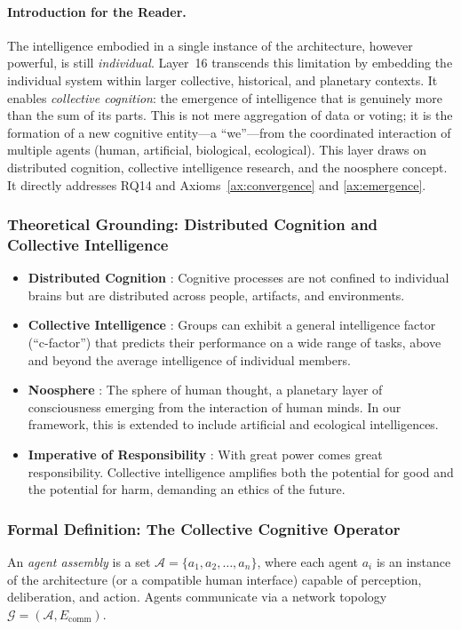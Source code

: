 \paragraph{Introduction for the Reader.}
The intelligence embodied in a single instance of the \Apeiron{} architecture, however powerful, is still \emph{individual}. Layer~16 transcends this limitation by embedding the individual system within larger collective, historical, and planetary contexts. It enables \emph{collective cognition}: the emergence of intelligence that is genuinely more than the sum of its parts. This is not mere aggregation of data or voting; it is the formation of a new cognitive entity—a ``we''—from the coordinated interaction of multiple agents (human, artificial, biological, ecological). This layer draws on distributed cognition, collective intelligence research, and the noosphere concept. It directly addresses RQ14 and Axioms~\ref{ax:convergence} and \ref{ax:emergence}.

\subsubsection{Theoretical Grounding: Distributed Cognition and Collective Intelligence}
\begin{itemize}
    \item \textbf{Distributed Cognition} \cite{hutchins1995}: Cognitive processes are not confined to individual brains but are distributed across people, artifacts, and environments.
    \item \textbf{Collective Intelligence} \cite{woolley2010}: Groups can exhibit a general intelligence factor (``c-factor'') that predicts their performance on a wide range of tasks, above and beyond the average intelligence of individual members.
    \item \textbf{Noosphere} \cite{teilhard1955}: The sphere of human thought, a planetary layer of consciousness emerging from the interaction of human minds. In our framework, this is extended to include artificial and ecological intelligences.
    \item \textbf{Imperative of Responsibility} \cite{jonas1984}: With great power comes great responsibility. Collective intelligence amplifies both the potential for good and the potential for harm, demanding an ethics of the future.
\end{itemize}

\subsubsection{Formal Definition: The Collective Cognitive Operator}
\begin{definition}
An \emph{agent assembly} is a set $\mathcal{A} = \{a_1, a_2, \dots, a_n\}$, where each agent $a_i$ is an instance of the \Apeiron{} architecture (or a compatible human interface) capable of perception, deliberation, and action. Agents communicate via a network topology $\mathcal{G} = (\mathcal{A}, E_{\text{comm}})$.
\end{definition}

